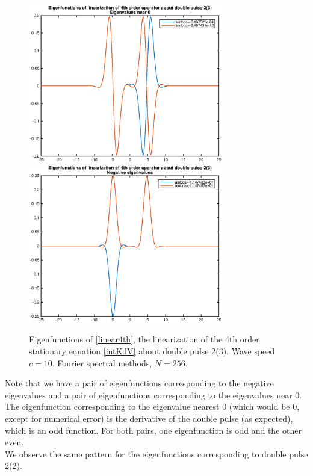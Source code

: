 \documentclass[12pt]{article}
\begin{document}
\begin{figure}[H]
	\includegraphics[width=8.5cm]{four10dp2inteigenfn1}
	\includegraphics[width=8.5cm]{four10dp2inteigenfn2}
	\caption{Eigenfunctions of \eqref{linear4th}, the linearization of the 4th order stationary equation \eqref{intKdV} about double pulse 2(3). Wave speed $c = 10$. Fourier spectral methods, $N = 256$.}
\end{figure}

Note that we have a pair of eigenfunctions corresponding to the negative eigenvalues and a pair of eigenfunctions corresponding to the eigenvalues near 0. The eigenfunction corresponding to the eigenvalue nearest 0 (which would be 0, except for numerical error) is the derivative of the double pulse (as expected), which is an odd function. For both pairs, one eigenfunction is odd and the other even. \\

We observe the same pattern for the eigenfunctions corresponding to double pulse 2(2).
\end{document}
